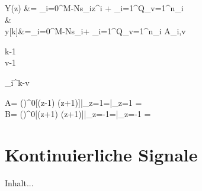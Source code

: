 \documentclass[parskip=half]{scrreprt}
\newcounter{BoxCounter}
\newcommand{\ztransrueck}{\rotatebox[origin=c]{90}{$\laplace$}}
\begin{document}
\begin{abox}
	Y(z) &= \sum_{i=0}^{M-N}s_iz^i + \sum_{i=1}^{Q}\sum_{v=1}^{n_i}\\
	&\ztransrueck\\
	y[k]&=\sum_{i=0}^{M-N}s_i\delta[k+i] + \sum_{i=1}^{Q}\sum_{v=1}^{n_i} A_{i,v}\cdot \begin{pmatrix}
		k-1 \\v-1
	\end{pmatrix} \lambda_i^{k-v}\epsilon[k-1]
\end{abox}

	\setcounter{BoxCounter}{146}
\begin{abox}
	A= \left(\right)^0[(z-1) \cdot {}(z+1)]|_{z=1}=|_{z=1} = \\
		B= \left(\right)^0[(z+1) \cdot {}(z+1)]|_{z=-1}=|_{z=-1} = 
\end{abox}


\chapter{Kontinuierliche Signale}

\begin{abox}
	Inhalt...
\end{abox}
\end{document}

